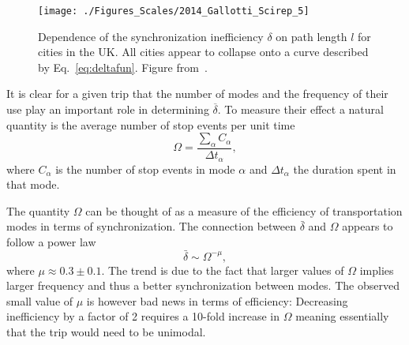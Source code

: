  \begin{figure}[t!]
 \centering
 \texttt{[image: ./Figures\_Scales/2014\_Gallotti\_Scirep\_5]}
 \caption{Dependence of the synchronization inefficiency $\delta$ on path length $l$ for cities in the UK. All cities appear to collapse onto a curve described by Eq.~\eqref{eq:deltafun}. Figure from~\cite{gallotti_2014_anatomy}.}
 \label{fig:anatomyb}
 \end{figure}

It is clear for a given trip that the number of modes and the frequency of their use play an important role in determining $\overline{\delta}$. To measure their effect a natural quantity is the average number of stop events per unit time 
\begin{equation}
\Omega = \frac{\sum_\alpha C_\alpha}{\Delta t_{\alpha}},
\end{equation}
where $C_\alpha$ is the number of stop events in mode $\alpha$ and $\Delta t_{\alpha}$ the duration spent in that mode.

The quantity $\Omega$ can be thought of as a measure of the efficiency of transportation modes in terms of synchronization. The connection between  $\bar\delta$ and $\Omega$ appears to follow a power law \cite{gallotti_2014_anatomy}
\begin{equation}
\bar\delta \sim  \Omega^{-\mu},
\label{eq:deltaomega}
\end{equation}
where $\mu\approx 0.3\pm 0.1$.  The trend is due to the fact that larger values of $\Omega$ implies larger frequency and thus a better synchronization between modes. The observed small value of $\mu$ is however bad news in terms of efficiency: Decreasing inefficiency by a factor of 2 requires a 10-fold increase in $\Omega$ meaning essentially that the trip would need to be unimodal.


